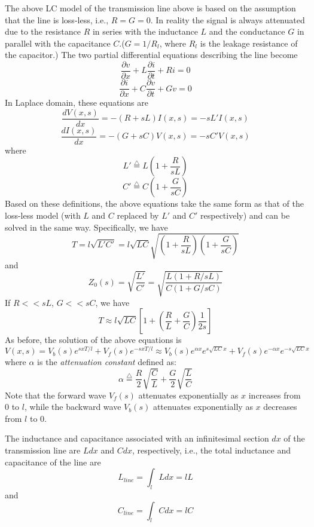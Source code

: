 The above LC model of the transmission line above is based on the 
assumption that the line is loss-less, i.e., $R=G=0$. In reality the 
signal is always attenuated due to the resistance $R$ in series with 
the inductance $L$ and the conductance $G$ in parallel with the 
capacitance $C$.($G=1/R_l$, where $R_l$ is the leakage resistance of
the capacitor.) The two partial differential equations describing the
line become
\[
\frac{\partial v}{\partial x}+L \frac{\partial i}{\partial t}+Ri=0
\]
\[
\frac{\partial i}{\partial x}+C \frac{\partial v}{\partial t}+Gv=0
\]
In Laplace domain, these equations are
\[
\frac{dV(x,s)}{dx}=-(R+sL)I(x,s)=-sL'I(x,s)
\]
\[
\frac{dI(x,s)}{dx}=-(G+sC)V(x,s)=-sC'V(x,s)
\]
where
\[	L'\stackrel{\triangle}{=}L(1+\frac{R}{sL})	\]
\[	C'\stackrel{\triangle}{=}C(1+\frac{G}{sC})	\]
Based on these definitions, the above equations take the same form
as that of the loss-less model (with $L$ and $C$ replaced by $L'$ and
$C'$ respectively) and can be solved in the same way. Specifically,
we have
\[
T=l\sqrt{L'C'}=l\sqrt{LC}\sqrt{(1+\frac{R}{sL})(1+\frac{G}{sC})}
\]
and
\[ Z_0(s)=\sqrt{\frac{L'}{C'}}=\sqrt{\frac{L(1+R/sL)}{C(1+G/sC)}}
\]
If $R<<sL$, $G<<sC$, we have
\[ T\approx l\sqrt{LC}[1+(\frac{R}{L}+\frac{G}{C})\frac{1}{2s}]	\]
As before, the solution of the above equations is
\[	V(x,s)=V_b(s)e^{sxT/l}+V_f(s)e^{-sxT/l}
	\approx V_b(s)e^{\alpha x}e^{s\sqrt{LC}x}
	+V_f(s)e^{-\alpha x}e^{-s\sqrt{LC}x}
\]
where $\alpha$ is the {\em attenuation constant} defined as:
\[
\alpha\stackrel{\triangle}{=}\frac{R}{2}\sqrt{\frac{C}{L}}+
	\frac{G}{2}\sqrt{\frac{L}{C}}
\]
Note that the forward wave $V_f(s)$ attenuates exponentially as
$x$ increases from 0 to $l$, while the backward wave $V_b(s)$
attenuates exponentially as $x$ decreases from $l$ to 0.







The inductance and capacitance 
associated with an infinitesimal section $dx$ of the transmission 
line are $Ldx$ and $Cdx$, respectively, i.e., the total inductance
and capacitance of the line are
\[	L_{line}=\int_l Ldx=lL	\]
and
\[	C_{line}=\int_l Cdx=lC	\]
